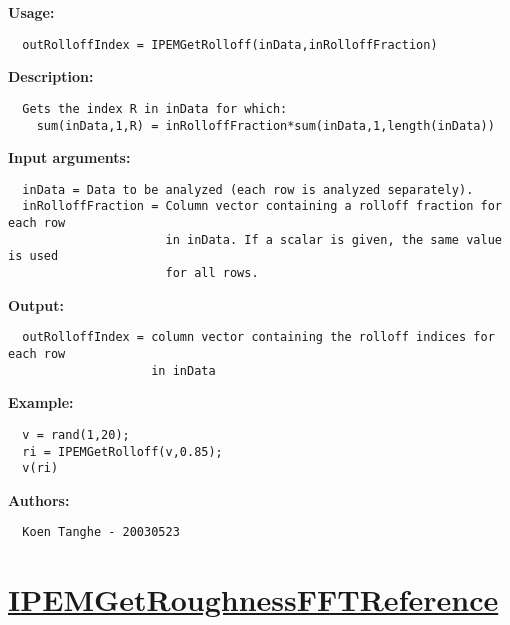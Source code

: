 \textbf{Usage:}
\begin{verbatim}  outRolloffIndex = IPEMGetRolloff(inData,inRolloffFraction)

\end{verbatim}
\textbf{Description:}
\begin{verbatim}  Gets the index R in inData for which:
    sum(inData,1,R) = inRolloffFraction*sum(inData,1,length(inData))

\end{verbatim}
\textbf{Input arguments:}
\begin{verbatim}  inData = Data to be analyzed (each row is analyzed separately).
  inRolloffFraction = Column vector containing a rolloff fraction for each row
                      in inData. If a scalar is given, the same value is used
                      for all rows.

\end{verbatim}
\textbf{Output:}
\begin{verbatim}  outRolloffIndex = column vector containing the rolloff indices for each row
                    in inData

\end{verbatim}
\textbf{Example:}
\begin{verbatim}  v = rand(1,20);
  ri = IPEMGetRolloff(v,0.85);
  v(ri)

\end{verbatim}
\textbf{Authors:}
\begin{verbatim}  Koen Tanghe - 20030523
\end{verbatim}


\newpage
\section*{\hyperlink{Concepts:IPEMGetRoughnessFFTReference}{IPEMGetRoughnessFFTReference}}
\hypertarget{FuncRef:IPEMGetRoughnessFFTReference}{}

